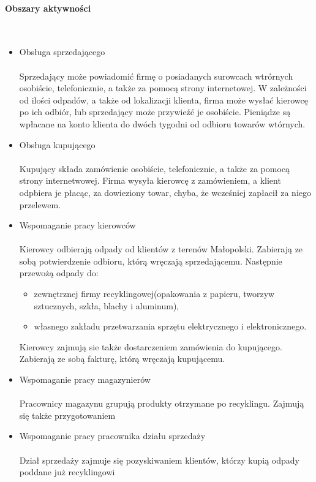 


\paragraph{Obszary aktywności} \ \\
\begin{itemize}
	\item Obsługa sprzedającego 
	\paragraph{} Sprzedający może powiadomić firmę o posiadanych surowcach wtrórnych osobiście, telefonicznie, a także za pomocą strony internetowej. W zależności od ilości odpadów, a także od lokalizacji klienta, firma może wysłać kierowcę po ich odbiór, lub sprzedający może przywieźć je osobiście. Pieniądze są wpłacane na konto klienta do dwóch tygodni od odbioru towarów wtórnych.
	\item Obsługa kupującego 
	\paragraph{} 	Kupujący składa zamówienie osobiście, telefonicznie, a także za pomocą strony internetwowej. Firma wysyła kierowcę z zamówieniem, a klient odpbiera je płacąc, za dowieziony towar, chyba, że wcześniej zapłacił za niego przelewem.
	\item Wspomaganie pracy kierowców 
	\paragraph{} 	Kierowcy odbierają odpady od klientów z terenów Małopolski. Zabierają ze sobą potwierdzenie odbioru, którą wręczają sprzedającemu. Następnie przewożą odpady do:
		\begin{itemize}
			\item zewnętrznej firmy recyklingowej(opakowania z papieru, tworzyw sztucznych, szkła, blachy i aluminum),
			\item własnego zakładu przetwarzania sprzętu elektrycznego i elektronicznego.
		\end{itemize}
	Kierowcy zajmują sie także dostarczeniem zamówienia do kupującego. Zabierają ze sobą fakturę, którą wręczają kupującemu.
	\item Wspomaganie pracy magazynierów 
	\paragraph{} Pracownicy magazynu grupują produkty otrzymane po recyklingu. Zajmują się także przygotowaniem 
	\item Wspomaganie pracy pracownika działu sprzedaży 
	\paragraph{} Dział sprzedaży zajmuje się pozyskiwaniem klientów, którzy kupią odpady poddane już recyklingowi
\end{itemize}